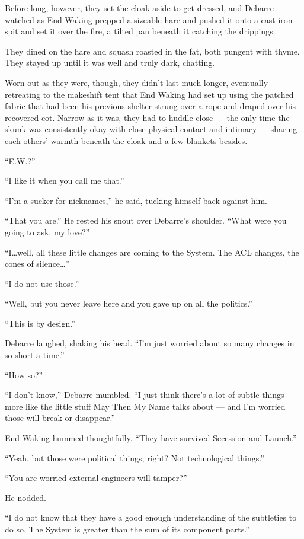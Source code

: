 Before long, however, they set the cloak aside to get dressed, and Debarre watched as End Waking prepped a sizeable hare and pushed it onto a cast-iron spit and set it over the fire, a tilted pan beneath it catching the drippings.

They dined on the hare and squash roasted in the fat, both pungent with thyme. They stayed up until it was well and truly dark, chatting.

Worn out as they were, though, they didn't last much longer, eventually retreating to the makeshift tent that End Waking had set up using the patched fabric that had been his previous shelter strung over a rope and draped over his recovered cot. Narrow as it was, they had to huddle close — the only time the skunk was consistently okay with close physical contact and intimacy — sharing each others' warmth beneath the cloak and a few blankets besides.

``E.W.?''

``I like it when you call me that.''

``I'm a sucker for nicknames,'' he said, tucking himself back against him.

``That you are.'' He rested his snout over Debarre's shoulder. ``What were you going to ask, my love?''

``I\ldots well, all these little changes are coming to the System. The ACL changes, the cones of silence\ldots{}''

``I do not use those.''

``Well, but you never leave here and you gave up on all the politics.''

``This is by design.''

Debarre laughed, shaking his head. ``I'm just worried about so many changes in so short a time.''

``How so?''

``I don't know,'' Debarre mumbled. ``I just think there's a lot of subtle things — more like the little stuff May Then My Name talks about — and I'm worried those will break or disappear.''

End Waking hummed thoughtfully. ``They have survived Secession and Launch.''

``Yeah, but those were political things, right? Not technological things.''

``You are worried external engineers will tamper?''

He nodded.

``I do not know that they have a good enough understanding of the subtleties to do so. The System is greater than the sum of its component parts.''

